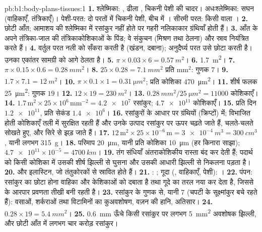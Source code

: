 \begin{solution}{pb:b1:body-plans-tissues:1}
\textbf{1.} श्लेष्मिका: , ढीला , चिकनी
पेशी की चादर। अधःश्लेष्मिका: सघन  (वाहिकाएँ, तंत्रिकाएँ)।
पेशी-परत: दो परतों में चिकनी पेशी, बीच में ।
सीरमी परत: किसी  वाला ।
\textbf{2.} छोटी आँत; आमाशय की श्लेष्मिका में रसांकुर नहीं होते पर
गहरी नलिकाकार ग्रंथियाँ होती हैं।
\textbf{3.} आँत के अपने तंत्रिका-जाल की तंत्रिकाकोशिकाओं के पिंड; वे
संकुचन (मिश्रण तथा ठेलना) और स्राव नियंत्रित करते हैं।
\textbf{4.} वर्तुल परत नली को सँकरा करती है (खंडन,
दबाना); अनुदैर्घ्य परत उसे छोटा करती है। उनका एकांतर
सामग्री को आगे ठेलता है।
\textbf{5.} $\pi\times 0.03\times 6 = \qty{0.57}{m^2}$।
\textbf{6.} \qty{1.7}{m^2}।
\textbf{7.} $\pi\times 0.15\times 0.6 = \qty{0.28}{mm^2}$।
\textbf{8.} $25\times 0.28 = \qty{7.1}{mm^2}$ प्रति mm$^2$: गुणक $7$।
\textbf{9.} $1.7\times 7.1 = \qty{12}{m^2}$।
\textbf{10.} $\pi\times 0.1\times 1 = \qty{0.31}{\micro m^2}$;
प्रति कोशिका \qty{470}{\micro m^2}।
\textbf{11.} शीर्ष फलक \qty{25}{\micro m^2}: गुणक $19$।
\textbf{12.} $12\times 19 = \qty{230}{m^2}$।
\textbf{13.} $\qty{0.28}{mm^2}/\qty{25}{\micro m^2} = \num{11000}$ कोशिकाएँ।
\textbf{14.} $1.7\,\mathrm{m^2}\times 25\times 10^6\,\mathrm{mm^{-2}} =
\num{4.2e7}$ रसांकुर; $\num{4.7e11}$ कोशिकाएँ।
\textbf{15.} प्रति दिन $\num{1.2e11}$, प्रति सेकंड $\num{1.4e6}$।
\textbf{16.} रसांकुरों के आधार पर ग्रंथियों (क्रिप्टों) में; विभाजित
होती कोशिकाएँ तली में सुरक्षित रहती हैं और उनके उत्पाद रसांकुर पर ऊपर
चढ़ते जाते हैं, चलते-चलते सोखते हुए, और सिरे से झड़ जाते हैं।
\textbf{17.} $12\,\mathrm{m^2}\times 25\times 10^{-6}\,\mathrm{m} =
\qty{3e-4}{m^3} = \qty{300}{cm^3}$, यानी लगभग \qty{315}{g}।
\textbf{18.} परिमाप \qty{20}{\micro m}, यानी प्रति कोशिका
\qty{10}{\micro m} (हर किनारा साझा); $\num{4.7e11}\times 10^{-5} = \qty{4700}{km}$।
\textbf{19.} तंग संधियाँ अंतराकोशिकीय रास्ता बंद कर देती हैं; पदार्थ को
किसी कोशिका में उसकी शीर्ष झिल्ली से घुसना और उसकी आधारी झिल्ली से निकलना
पड़ता है।
\textbf{20.}  और इलास्टिन, जो तंतुकोरकों से स्रावित होते हैं।
\textbf{21.} : ; गूदा (, वाहिकाएँ,
पेशी): ।
\textbf{22.} पंपन: रसांकुर का छोटा होना  वाहिका और केशिकाओं को
दबाता है तथा गूदे का तरल नया कर देता है, जिससे  के आरपार प्रवणता
तीखी बनी रहती है।
\textbf{23.} रसांकुर के गुणक से, यानी $7$ (चपटी  के सूक्ष्मांकुर बचे
रहते हैं): वसाओं, शर्कराओं तथा विटामिनों का कुअवशोषण, वज़न की
हानि, अतिसार।
\textbf{24.} $0.28\times 19 = \qty{5.4}{mm^2}$।
\textbf{25.} \qty{0.6}{mm} ऊँचे किसी रसांकुर पर लगभग \qty{5}{mm^2}
अवशोषक झिल्ली, और छोटी आँत में लगभग चार करोड़
रसांकुर।
\end{solution}
